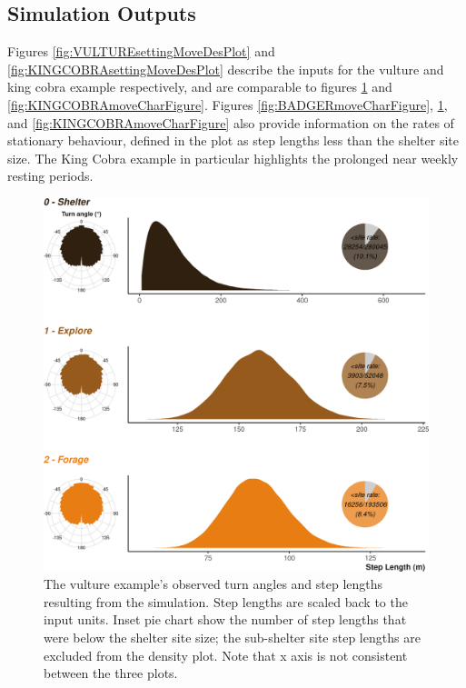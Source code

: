 \documentclass[10pt,a4paper]{article}
\begin{document}
\clearpage

\hypertarget{simulation-outputs}{%
\subsection{Simulation Outputs}\label{simulation-outputs}}

Figures \ref{fig:VULTUREsettingMoveDesPlot} and \ref{fig:KINGCOBRAsettingMoveDesPlot} describe the inputs for the vulture and king cobra example respectively, and are comparable to figures \ref{fig:VULTUREmoveCharFigure} and \ref{fig:KINGCOBRAmoveCharFigure}.
Figures \ref{fig:BADGERmoveCharFigure}, \ref{fig:VULTUREmoveCharFigure}, and \ref{fig:KINGCOBRAmoveCharFigure} also provide information on the rates of stationary behaviour, defined in the plot as step lengths less than the shelter site size.
The King Cobra example in particular highlights the prolonged near weekly resting periods.

\begin{figure}

{\centering \includegraphics{Agent-based_model_walkthrough_files/figure-latex/VULTUREmoveCharFigure-1} 

}

\caption{The vulture example's observed turn angles and step lengths resulting from the simulation. Step lengths are scaled back to the input units. Inset pie chart show the number of step lengths that were below the shelter site size; the sub-shelter site step lengths are excluded from the density plot. Note that x axis is not consistent between the three plots.}\label{fig:VULTUREmoveCharFigure}
\end{figure}
\end{document}
